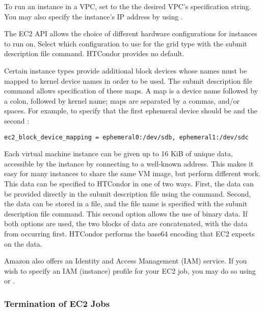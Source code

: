 To run an instance in a VPC, set  to the
the desired VPC's specification string.  You may also specify the instance's
IP address by using .

The EC2 API allows the choice of different hardware configurations 
for instances to run on.
Select which configuration to use for the  grid type
with the  submit description file command.
HTCondor provides no default.

Certain instance types provide additional block devices whose names must be
mapped to kernel device names in order to be used.
The  submit description file command
allows specification of these maps.  
A map is a device name followed by a
colon, followed by kernel name; 
maps are separated by a commas, and/or spaces.
For example, 
to specify that the first ephemeral device should be 
and the second :

\begin{verbatim}
ec2_block_device_mapping = ephemeral0:/dev/sdb, ephemeral1:/dev/sdc
\end{verbatim}

Each virtual machine instance can be given up to 16 KiB of unique data, 
accessible by the instance by connecting to a well-known address.
This makes it easy for many instances to share the same VM image,
but perform different work.
This data can be specified to HTCondor in one of two ways.
First, the data can be provided directly in the submit description file 
using the  command.
Second, the data can be
stored in a file, and the file name is specified with the
 submit description file command.
This second option allows the use of binary data.
If both options are used, the two blocks of
data are concatenated, with the data from  
occurring first.  HTCondor performs the base64 encoding that EC2 expects on 
the data.

Amazon also offers an Identity and Access Management (IAM) service.  If you
wish to specify an IAM (instance) profile for your EC2 job, you may do so
using  or .

\subsubsection{\label{sec:EC2-termination}Termination of EC2 Jobs}

